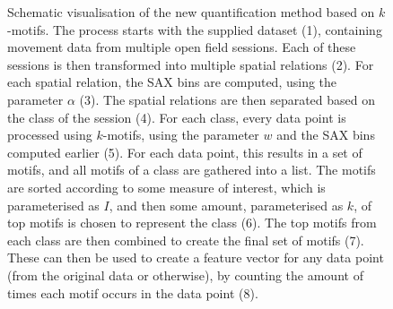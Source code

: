 \documentclass[conference,a4paper,twoside]{IEEEtran}
\begin{document}
\begin{figure}
    \caption{Schematic visualisation of the new quantification method based on $k$-motifs. The process starts with the supplied dataset (1), containing movement data from multiple open field sessions. Each of these sessions is then transformed into multiple spatial relations (2). For each spatial relation, the SAX bins are computed, using the parameter $\alpha$ (3). The spatial relations are then separated based on the class of the session (4). For each class, every data point is processed using $k$-motifs, using the parameter $w$ and the SAX bins computed earlier (5). For each data point, this results in a set of motifs, and all motifs of a class are gathered into a list. The motifs are sorted according to some measure of interest, which is parameterised as $I$, and then some amount, parameterised as $k$, of top motifs is chosen to represent the class (6). The top motifs from each class are then combined to create the final set of motifs (7). These can then be used to create a feature vector for any data point (from the original data or otherwise), by counting the amount of times each motif occurs in the data point (8).}
    \label{fig:schema}
\end{figure}
\end{document}
